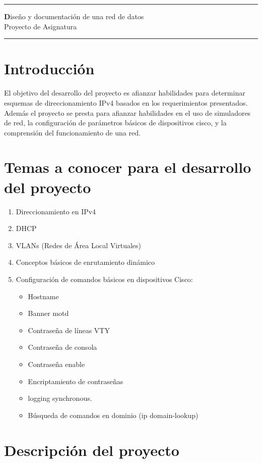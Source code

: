 \documentclass[12pt]{article}
\begin{document}

\begin{center}
\noindent\rule{\textwidth}{1pt}
{\huge\textbf Diseño y documentación de una red de datos}\\
\vspace{10px}
Proyecto de Asignatura
\noindent\rule{\textwidth}{1pt}
\end{center}

\section{Introducción} 
El objetivo del desarrollo del proyecto es afianzar habilidades para determinar esquemas de direccionamiento IPv4 basados en los requerimientos presentados. Además el proyecto se presta para afianzar habilidades en el uso de simuladores de red, la configuración de parámetros básicos de dispositivos cisco, y la comprensión del funcionamiento de una red.

\section{Temas a conocer para el desarrollo del proyecto}
\begin{enumerate}
\item Direccionamiento en IPv4
\item DHCP
\item VLANs (Redes de Área Local Virtuales)
\item Conceptos básicos de enrutamiento dinámico
\item Configuración de comandos básicos en dispositivos Cisco:
	\begin{itemize}
    	\item Hostname
    	\item Banner motd
        \item Contraseña de líneas VTY
        \item Contraseña de consola
        \item Contraseña enable
        \item Encriptamiento de contraseñas
	        \item logging synchronous.
        \item Búsqueda de comandos en dominio (ip domain-lookup)
    \end{itemize}
\end{enumerate}

\section{Descripción del proyecto}
\end{document}
